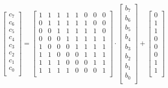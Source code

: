     \begin{equation}
        \begin{bmatrix}
            c_{7} \\
            c_{6} \\
            c_{5} \\
            c_{4} \\
            c_{3} \\
            c_{2} \\
            c_{1} \\
            c_{0} \\
        \end{bmatrix}
        =
        \begin{bmatrix}
            1 & 1 & 1 & 1 & 1 & 0 & 0 & 0 \\
            0 & 1 & 1 & 1 & 1 & 1 & 0 & 0 \\
            0 & 0 & 1 & 1 & 1 & 1 & 1 & 0 \\
            0 & 0 & 0 & 1 & 1 & 1 & 1 & 1 \\
            1 & 0 & 0 & 0 & 1 & 1 & 1 & 1 \\
            1 & 1 & 0 & 0 & 0 & 1 & 1 & 1 \\
            1 & 1 & 1 & 0 & 0 & 0 & 1 & 1 \\
            1 & 1 & 1 & 1 & 0 & 0 & 0 & 1 \\
        \end{bmatrix}
        \cdot
        \begin{bmatrix}
            b_{7} \\
            b_{6} \\
            b_{5} \\
            b_{4} \\
            b_{3} \\
            b_{2} \\
            b_{1} \\
            b_{0} \\
        \end{bmatrix}
        +
        \begin{bmatrix}
            0 \\
            1 \\
            1 \\
            0 \\
            0 \\
            0 \\
            1 \\
            1 \\
        \end{bmatrix}
    \end{equation}

